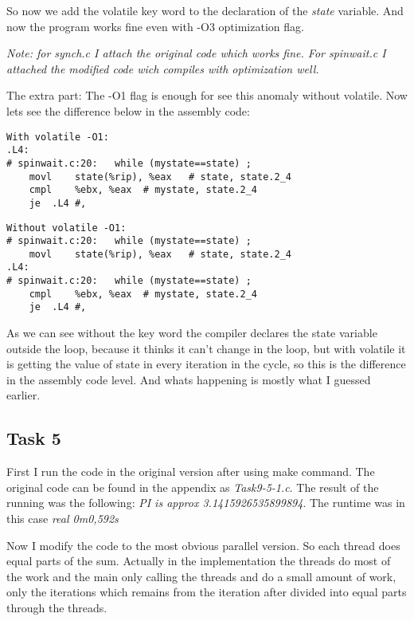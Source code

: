 So now we add the volatile key word to the declaration of the \textit{state} variable. And now the program works fine even with -O3 optimization flag. 

\textit{Note: for \textit{synch.c} I attach the original code which works fine. For \textit{spinwait.c} I attached the modified code wich compiles with optimization well.}

\bigskip

The extra part: The -O1 flag is enough for see this anomaly without volatile. Now lets see the difference below in the assembly code:

\begin{lstlisting}[basicstyle=\ttfamily, frame=single]
With volatile -O1:
.L4:
# spinwait.c:20:   while (mystate==state) ;
	movl	state(%rip), %eax	# state, state.2_4
	cmpl	%ebx, %eax	# mystate, state.2_4
	je	.L4	#,
\end{lstlisting}

\begin{lstlisting}[basicstyle=\ttfamily, frame=single]
Without volatile -O1:
# spinwait.c:20:   while (mystate==state) ;
	movl	state(%rip), %eax	# state, state.2_4
.L4:
# spinwait.c:20:   while (mystate==state) ;
	cmpl	%ebx, %eax	# mystate, state.2_4
	je	.L4	#,
\end{lstlisting}

As we can see without the key word the compiler declares the state variable outside the loop, because it thinks it can't change in the loop, but with volatile it is getting the value of state in every iteration in the cycle, so this is the difference in the assembly code level. And whats happening is mostly what I guessed earlier.

\subsection*{Task 5}
First I run the code in the original version after using make command. The original code can be found in the appendix as \textit{Task9-5-1.c}. The result of the running was the following: \textit{PI is approx 3.1415926535899894}.  The runtime was in this case \textit{real 0m0,592s}

Now I modify the code to the most obvious parallel version. So each thread does equal parts of the sum. Actually in the implementation the threads do most of the work and the main only calling the threads and do a small amount of work, only the iterations which remains from the iteration after divided into equal parts through the threads. 

